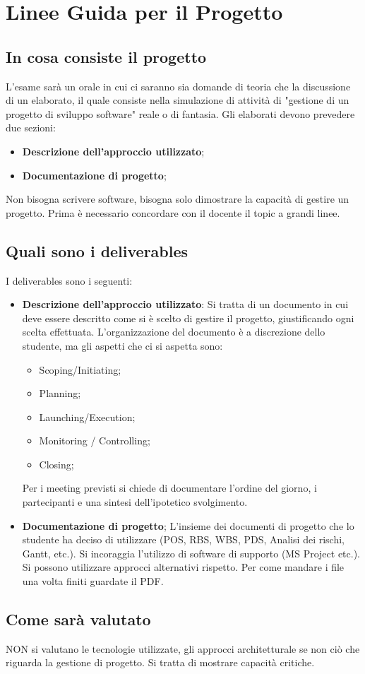 \section{Linee Guida per il Progetto}
\subsection{In cosa consiste il progetto}
L'esame sarà un orale in cui ci saranno sia domande di teoria che la discussione di un elaborato, il quale consiste nella simulazione di attività di "gestione di un progetto di sviluppo software" reale o di fantasia.\newline
Gli elaborati devono prevedere due sezioni:
\begin{itemize}
	\item \textbf{Descrizione dell'approccio utilizzato};
	\item \textbf{Documentazione di progetto};
\end{itemize}
Non bisogna scrivere software, bisogna solo dimostrare la capacità di gestire un progetto. Prima è necessario concordare con il docente il topic a grandi linee.
\subsection{Quali sono i deliverables}
I deliverables sono i seguenti:
\begin{itemize}
	\item \textbf{Descrizione dell'approccio utilizzato}: Si tratta di un documento in cui deve essere descritto come si è scelto di gestire il progetto, giustificando ogni scelta effettuata. L'organizzazione del documento è a discrezione dello studente, ma gli aspetti che ci si aspetta sono:
	\begin{itemize}
		\item Scoping/Initiating;
		\item Planning;
		\item Launching/Execution;
		\item Monitoring / Controlling;
		\item Closing;
	\end{itemize}
	Per i meeting previsti si chiede di documentare l'ordine del giorno, i partecipanti e una sintesi dell'ipotetico svolgimento.
	\item \textbf{Documentazione di progetto}; L'insieme dei documenti di progetto che lo studente ha deciso di utilizzare (POS, RBS, WBS, PDS, Analisi dei rischi, Gantt, etc.).\newline
	Si incoraggia l'utilizzo di software di supporto (MS Project etc.). Si possono utilizzare approcci alternativi rispetto. Per come mandare i file una volta finiti guardate il PDF.
\end{itemize}
\subsection{Come sarà valutato}
NON si valutano le tecnologie utilizzate, gli approcci architetturale se non ciò che riguarda la gestione di progetto. Si tratta di mostrare capacità critiche.
\newpage